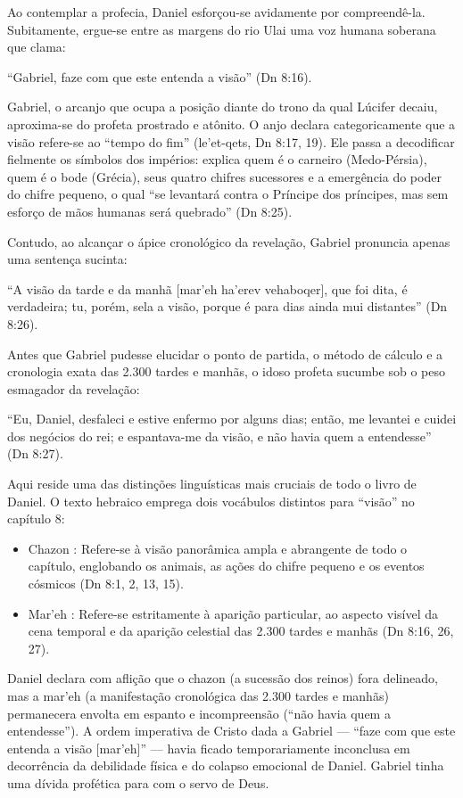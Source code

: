 Ao contemplar a profecia, Daniel esforçou-se avidamente por compreendê-la. Subitamente, ergue-se entre as margens do rio Ulai uma voz humana soberana que clama:

``Gabriel, faze com que este entenda a visão'' (Dn 8:16).

Gabriel, o arcanjo que ocupa a posição diante do trono da qual Lúcifer decaiu, aproxima-se do profeta prostrado e atônito. O anjo declara categoricamente que a visão refere-se ao ``tempo do fim'' (le'et-qets, Dn 8:17, 19). Ele passa a decodificar fielmente os símbolos dos impérios: explica quem é o carneiro (Medo-Pérsia), quem é o bode (Grécia), seus quatro chifres sucessores e a emergência do poder do chifre pequeno, o qual ``se levantará contra o Príncipe dos príncipes, mas sem esforço de mãos humanas será quebrado'' (Dn 8:25).

Contudo, ao alcançar o ápice cronológico da revelação, Gabriel pronuncia apenas uma sentença sucinta:

``A visão da tarde e da manhã [mar'eh ha'erev vehaboqer], que foi dita, é verdadeira; tu, porém, sela a visão, porque é para dias ainda mui distantes'' (Dn 8:26).

Antes que Gabriel pudesse elucidar o ponto de partida, o método de cálculo e a cronologia exata das 2.300 tardes e manhãs, o idoso profeta sucumbe sob o peso esmagador da revelação:

``Eu, Daniel, desfaleci e estive enfermo por alguns dias; então, me levantei e cuidei dos negócios do rei; e espantava-me da visão, e não havia quem a entendesse'' (Dn 8:27).

Aqui reside uma das distinções linguísticas mais cruciais de todo o livro de Daniel. O texto hebraico emprega dois vocábulos distintos para ``visão'' no capítulo 8:
\begin{itemize}
  \item Chazon : Refere-se à visão panorâmica ampla e abrangente de todo o capítulo, englobando os animais, as ações do chifre pequeno e os eventos cósmicos (Dn 8:1, 2, 13, 15).
  \item Mar'eh : Refere-se estritamente à aparição particular, ao aspecto visível da cena temporal e da aparição celestial das 2.300 tardes e manhãs (Dn 8:16, 26, 27).
\end{itemize}


Daniel declara com aflição que o chazon (a sucessão dos reinos) fora delineado, mas a mar'eh (a manifestação cronológica das 2.300 tardes e manhãs) permanecera envolta em espanto e incompreensão (``não havia quem a entendesse''). A ordem imperativa de Cristo dada a Gabriel — ``faze com que este entenda a visão [mar'eh]'' — havia ficado temporariamente inconclusa em decorrência da debilidade física e do colapso emocional de Daniel. Gabriel tinha uma dívida profética para com o servo de Deus.



